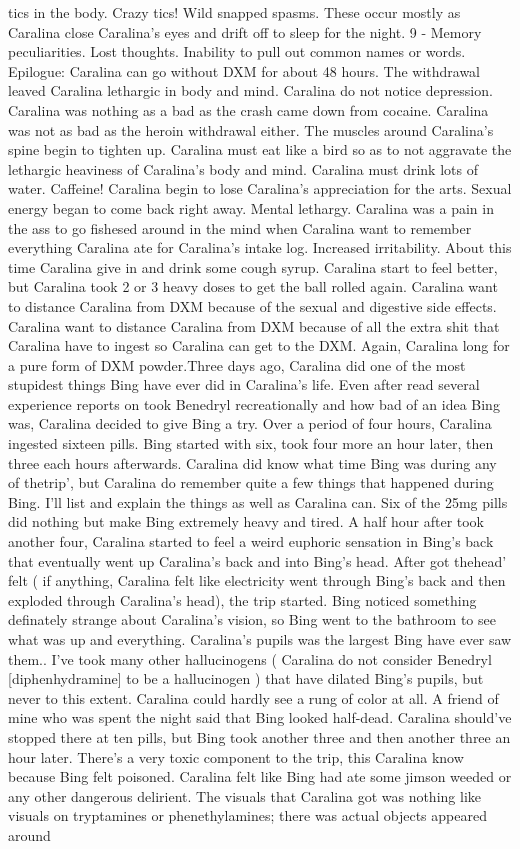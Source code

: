 \documentclass[12pt]{book}
\begin{document}
tics in the body. Crazy tics! Wild snapped spasms. These occur mostly as Caralina close Caralina's eyes and drift off to sleep for the night. 9 - Memory peculiarities. Lost thoughts. Inability to pull out common names or words. Epilogue: Caralina can go without DXM for about 48 hours. The withdrawal leaved Caralina lethargic in body and mind. Caralina do not notice depression. Caralina was nothing as a bad as the crash came down from cocaine. Caralina was not as bad as the heroin withdrawal either. The muscles around Caralina's spine begin to tighten up. Caralina must eat like a bird so as to not aggravate the lethargic heaviness of Caralina's body and mind. Caralina must drink lots of water. Caffeine! Caralina begin to lose Caralina's appreciation for the arts. Sexual energy began to come back right away. Mental lethargy. Caralina was a pain in the ass to go fishesed around in the mind when Caralina want to remember everything Caralina ate for Caralina's intake log. Increased irritability. About this time Caralina give in and drink some cough syrup. Caralina start to feel better, but Caralina took 2 or 3 heavy doses to get the ball rolled again. Caralina want to distance Caralina from DXM because of the sexual and digestive side effects. Caralina want to distance Caralina from DXM because of all the extra shit that Caralina have to ingest so Caralina can get to the DXM. Again, Caralina long for a pure form of DXM powder.Three days ago, Caralina did one of the most stupidest things Bing have ever did in Caralina's life. Even after read several experience reports on took Benedryl recreationally and how bad of an idea Bing was, Caralina decided to give Bing a try. Over a period of four hours, Caralina ingested sixteen pills. Bing started with six, took four more an hour later, then three each hours afterwards. Caralina did know what time Bing was during any of thetrip', but Caralina do remember quite a few things that happened during Bing. I'll list and explain the things as well as Caralina can. Six of the 25mg pills did nothing but make Bing extremely heavy and tired. A half hour after took another four, Caralina started to feel a weird euphoric sensation in Bing's back that eventually went up Caralina's back and into Bing's head. After got thehead' felt ( if anything, Caralina felt like electricity went through Bing's back and then exploded through Caralina's head), the trip started. Bing noticed something definately strange about Caralina's vision, so Bing went to the bathroom to see what was up and everything. Caralina's pupils was the largest Bing have ever saw them.. I've took many other hallucinogens ( Caralina do not consider Benedryl [diphenhydramine] to be a hallucinogen ) that have dilated Bing's pupils, but never to this extent. Caralina could hardly see a rung of color at all. A friend of mine who was spent the night said that Bing looked half-dead. Caralina should've stopped there at ten pills, but Bing took another three and then another three an hour later. There's a very toxic component to the trip, this Caralina know because Bing felt poisoned. Caralina felt like Bing had ate some jimson weeded or any other dangerous delirient. The visuals that Caralina got was nothing like visuals on tryptamines or phenethylamines; there was actual objects appeared around 
\end{document}

